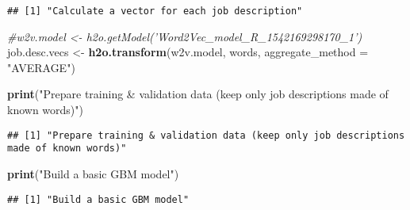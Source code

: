 \documentclass[]{article}
\newenvironment{Shaded}{\begin{snugshade}}{\end{snugshade}}
\newcommand{\KeywordTok}[1]{\textcolor[rgb]{0.13,0.29,0.53}{\textbf{{#1}}}}
\newcommand{\DataTypeTok}[1]{\textcolor[rgb]{0.13,0.29,0.53}{{#1}}}
\newcommand{\FloatTok}[1]{\textcolor[rgb]{0.00,0.00,0.81}{{#1}}}
\newcommand{\StringTok}[1]{\textcolor[rgb]{0.31,0.60,0.02}{{#1}}}
\newcommand{\CommentTok}[1]{\textcolor[rgb]{0.56,0.35,0.01}{\textit{{#1}}}}
\newcommand{\NormalTok}[1]{{#1}}
\begin{document}
\begin{verbatim}
## [1] "Calculate a vector for each job description"
\end{verbatim}

\begin{Shaded}
\begin{Highlighting}[]
\CommentTok{#w2v.model <- h2o.getModel('Word2Vec_model_R_1542169298170_1')}
\NormalTok{job.desc.vecs <-}\StringTok{ }\KeywordTok{h2o.transform}\NormalTok{(w2v.model, words, }\DataTypeTok{aggregate_method =} \StringTok{"AVERAGE"}\NormalTok{)}
\end{Highlighting}
\end{Shaded}

\begin{Shaded}
\begin{Highlighting}[]
\KeywordTok{print}\NormalTok{(}\StringTok{"Prepare training & validation data (keep only job descriptions made of known words)"}\NormalTok{)}
\end{Highlighting}
\end{Shaded}

\begin{verbatim}
## [1] "Prepare training & validation data (keep only job descriptions made of known words)"
\end{verbatim}

\begin{Shaded}
\end{Shaded}

\begin{Shaded}
\begin{Highlighting}[]
\KeywordTok{print}\NormalTok{(}\StringTok{"Build a basic GBM model"}\NormalTok{)}
\end{Highlighting}
\end{Shaded}

\begin{verbatim}
## [1] "Build a basic GBM model"
\end{verbatim}
\end{document}
